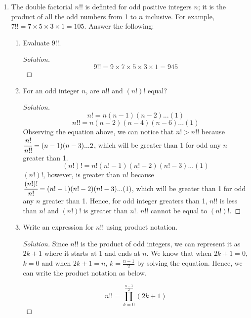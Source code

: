 \documentclass[12pt]{article}
\renewcommand\qedsymbol{$\blacksquare$}
\newenvironment{solution}
{\begin{proof}[Solution]\renewcommand\qedsymbol{$\square$}}
	{\end{proof}}
\begin{document}
\begin{enumerate}
		\item
		The double factorial $n!!$ is definted for odd positive integers $n$; it is the product of all the odd numbers from 1 to $n$ inclusive. For example, $7!! = 7 \times 5 \times 3 \times 1 = 105$. Answer
		the following:
		\begin{enumerate}[label=(\alph*)]
			\item 
			Evaluate $9!!$.
			\begin{solution}
				\[ 9!! = 9\times 7\times 5\times 3\times 1 = 945 \]
			\end{solution}
			\item
			For an odd integer $n$, are $n!!$ and $(n!)!$ equal?
			\begin{solution}

				\[n! = n(n-1)(n-2)...(1)\]
				\[n!!   = n(n-2)(n-4)(n-6)...(1)\]
				Observing the equation above, we can notice that $n!>n!!$ because $\cfrac{n!}{n!!} =   (n-1)(n-3)...2$, which will be greater than 1 for odd any $n$ greater than 1. 
				\[	(n!)! = n!(n!-1)(n!-2)(n!-3)...(1)\]
				$(n!)!$, however, is greater than $n!$ because $\cfrac{(n!)!}{n!} =(n!-1)(n!-2)(n!-3)...(1) $, which will be greater than 1 for odd any $n$ greater than 1. 
				Hence, for odd integer greaters than 1, $n!!$ is less than $n!$ and $(n!)!$ is greater than $n!$. $n!!$ cannot be equal to $(n!)!$.
			\end{solution}
			
			\item
			Write an expression for $n!!$ using product notation.
			\begin{solution}

				Since $n!!$ is the product of odd integers, we can represent it as $2k+1$ where it starts at 1 and ends at $n$. We know that when $2k+1=0$, $k=0$ and when $2k+1=n$, $k=\frac{n-1}{2}$ by solving the equation. Hence, we can write the product notation as below.
				
				\[ n!! = \prod_{k=0}^{\frac{n-1}{2}} (2k+1) \]
		
				\end{solution}
			

\end{enumerate}
\end{enumerate}
\end{document}

